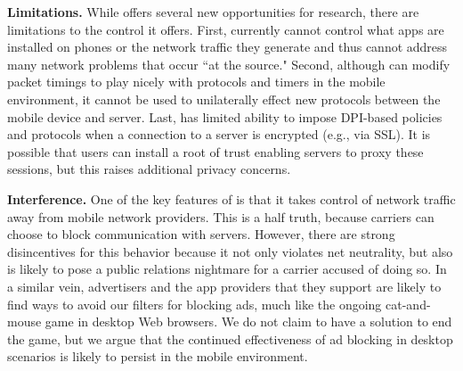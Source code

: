 \noindent\textbf{Limitations.} While \meddle offers several new opportunities for research, there are limitations 
to the control it offers. First, \meddle currently cannot control what apps are installed on phones or the network 
traffic they generate and thus cannot address many network problems that occur ``at the source." Second, although 
\meddle can modify packet timings to play nicely with protocols and timers in the mobile environment, it cannot 
be used to unilaterally effect new protocols between the mobile device and \meddle server. Last, \meddle has limited ability 
to impose DPI-based policies and protocols when a connection to a server is encrypted (e.g., via SSL). It is possible 
that users can install a root of trust enabling \meddle servers to proxy these sessions, but this 
raises additional privacy concerns.

\noindent\textbf{Interference.} One of the key features of \meddle is that it takes control of network traffic 
away from mobile network providers. This is a half truth, because carriers can choose to 
block communication with \meddle servers. However, 
there are strong disincentives for this behavior because it not only violates net neutrality, but also is likely to pose a public relations nightmare for a carrier accused of doing so. In 
a similar vein, advertisers and the app providers that they support are likely to find ways to avoid our filters 
for blocking ads, much like the ongoing cat-and-mouse game in desktop Web browsers. We 
do not claim to have a solution to end the game, but we argue that the continued effectiveness of ad blocking 
in desktop scenarios is likely to persist in the mobile environment.



